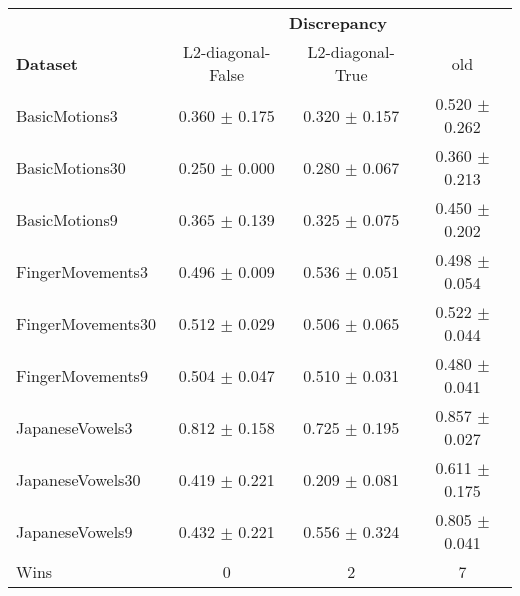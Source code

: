 \begin{tabular}{lccc}
\toprule
& \multicolumn{3}{c}{\textbf{Discrepancy}} \\
\textbf{Dataset} &  L2-diagonal-False &   L2-diagonal-True &                old \\
\midrule
BasicMotions3     &  0.360 $\pm$ 0.175 &  0.320 $\pm$ 0.157 &  0.520 $\pm$ 0.262 \\
BasicMotions30    &  0.250 $\pm$ 0.000 &  0.280 $\pm$ 0.067 &  0.360 $\pm$ 0.213 \\
BasicMotions9     &  0.365 $\pm$ 0.139 &  0.325 $\pm$ 0.075 &  0.450 $\pm$ 0.202 \\
FingerMovements3  &  0.496 $\pm$ 0.009 &  0.536 $\pm$ 0.051 &  0.498 $\pm$ 0.054 \\
FingerMovements30 &  0.512 $\pm$ 0.029 &  0.506 $\pm$ 0.065 &  0.522 $\pm$ 0.044 \\
FingerMovements9  &  0.504 $\pm$ 0.047 &  0.510 $\pm$ 0.031 &  0.480 $\pm$ 0.041 \\
JapaneseVowels3   &  0.812 $\pm$ 0.158 &  0.725 $\pm$ 0.195 &  0.857 $\pm$ 0.027 \\
JapaneseVowels30  &  0.419 $\pm$ 0.221 &  0.209 $\pm$ 0.081 &  0.611 $\pm$ 0.175 \\
JapaneseVowels9   &  0.432 $\pm$ 0.221 &  0.556 $\pm$ 0.324 &  0.805 $\pm$ 0.041 \\ 
\midrule
Wins &                  0 &                 2 &    7 \\
\bottomrule
\end{tabular}
